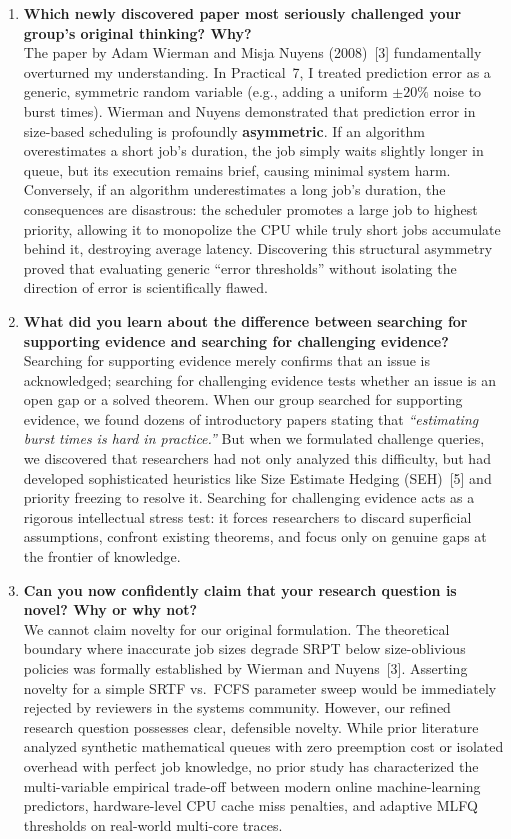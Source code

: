 \documentclass[11pt]{article}
\begin{document}
\begin{enumerate}[leftmargin=1.5em, itemsep=1.0em]

    \item \textbf{Which newly discovered paper most seriously challenged your group's original thinking? Why?} \\
    The paper by Adam Wierman and Misja Nuyens (2008)~[3] fundamentally overturned my understanding. In Practical~7, I treated prediction error as a generic, symmetric random variable (e.g., adding a uniform $\pm 20\%$ noise to burst times). Wierman and Nuyens demonstrated that prediction error in size-based scheduling is profoundly \textbf{asymmetric}. If an algorithm overestimates a short job's duration, the job simply waits slightly longer in queue, but its execution remains brief, causing minimal system harm. Conversely, if an algorithm underestimates a long job's duration, the consequences are disastrous: the scheduler promotes a large job to highest priority, allowing it to monopolize the CPU while truly short jobs accumulate behind it, destroying average latency. Discovering this structural asymmetry proved that evaluating generic ``error thresholds'' without isolating the direction of error is scientifically flawed.

    \item \textbf{What did you learn about the difference between searching for supporting evidence and searching for challenging evidence?} \\
    Searching for supporting evidence merely confirms that an issue is acknowledged; searching for challenging evidence tests whether an issue is an open gap or a solved theorem. When our group searched for supporting evidence, we found dozens of introductory papers stating that \textit{``estimating burst times is hard in practice.''} But when we formulated challenge queries, we discovered that researchers had not only analyzed this difficulty, but had developed sophisticated heuristics like Size Estimate Hedging (SEH)~[5] and priority freezing to resolve it. Searching for challenging evidence acts as a rigorous intellectual stress test: it forces researchers to discard superficial assumptions, confront existing theorems, and focus only on genuine gaps at the frontier of knowledge.

    \item \textbf{Can you now confidently claim that your research question is novel? Why or why not?} \\
    We cannot claim novelty for our original formulation. The theoretical boundary where inaccurate job sizes degrade SRPT below size-oblivious policies was formally established by Wierman and Nuyens~[3]. Asserting novelty for a simple SRTF vs.\ FCFS parameter sweep would be immediately rejected by reviewers in the systems community. However, our refined research question possesses clear, defensible novelty. While prior literature analyzed synthetic mathematical queues with zero preemption cost or isolated overhead with perfect job knowledge, no prior study has characterized the multi-variable empirical trade-off between modern online machine-learning predictors, hardware-level CPU cache miss penalties, and adaptive MLFQ thresholds on real-world multi-core traces.


\end{enumerate}
\end{document}
